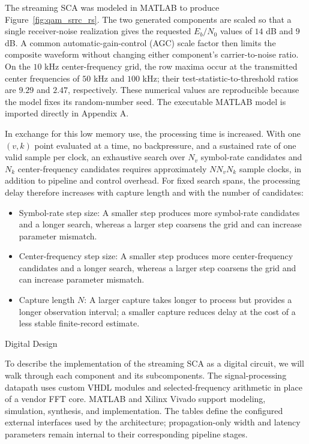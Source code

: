 The streaming SCA was modeled in MATLAB to produce Figure~\ref{fig:qam_srrc_rs}.  The two generated components are scaled so that a single receiver-noise realization gives the requested $E_b/N_0$ values of $14$ dB and $9$ dB.  A common automatic-gain-control (AGC) scale factor then limits the composite waveform without changing either component's carrier-to-noise ratio.  On the $10$ kHz center-frequency grid, the row maxima occur at the transmitted center frequencies of $50$ kHz and $100$ kHz; their test-statistic-to-threshold ratios are $9.29$ and $2.47$, respectively.  These numerical values are reproducible because the model fixes its random-number seed.  The executable MATLAB model is imported directly in Appendix A.

In exchange for this low memory use, the processing time is increased.  With one $(v,k)$ point evaluated at a time, no backpressure, and a sustained rate of one valid sample per clock, an exhaustive search over $N_v$ symbol-rate candidates and $N_k$ center-frequency candidates requires approximately $NN_vN_k$ sample clocks, in addition to pipeline and control overhead.  For fixed search spans, the processing delay therefore increases with capture length and with the number of candidates:

\begin{itemize}
\item Symbol-rate step size: A smaller step produces more symbol-rate candidates and a longer search, whereas a larger step coarsens the grid and can increase parameter mismatch.

\item Center-frequency step size: A smaller step produces more center-frequency candidates and a longer search, whereas a larger step coarsens the grid and can increase parameter mismatch.

\item Capture length $N$: A larger capture takes longer to process but provides a longer observation interval; a smaller capture reduces delay at the cost of a less stable finite-record estimate.
\end{itemize}

%
%
\bigskip
{}
  \quad Digital Design

To describe the implementation of the streaming SCA as a digital circuit, we will walk through each component and its subcomponents.  The signal-processing datapath uses custom VHDL modules and selected-frequency arithmetic in place of a vendor FFT core.  MATLAB and Xilinx Vivado support modeling, simulation, synthesis, and implementation.  The tables define the configured external interfaces used by the architecture; propagation-only width and latency parameters remain internal to their corresponding pipeline stages.


